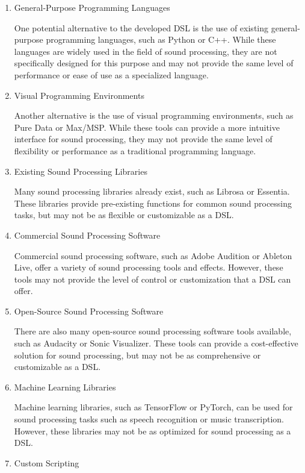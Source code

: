\begin{enumerate}
\item General-Purpose Programming Languages

One potential alternative to the developed DSL is the use of existing general-purpose programming languages, such as Python or C++. While these languages are widely used in the field of sound processing, they are not specifically designed for this purpose and may not provide the same level of performance or ease of use as a specialized language.

\item Visual Programming Environments

Another alternative is the use of visual programming environments, such as Pure Data or Max/MSP. While these tools can provide a more intuitive interface for sound processing, they may not provide the same level of flexibility or performance as a traditional programming language.

\item Existing Sound Processing Libraries

Many sound processing libraries already exist, such as Librosa or Essentia. These libraries provide pre-existing functions for common sound processing tasks, but may not be as flexible or customizable as a DSL.

\item Commercial Sound Processing Software

Commercial sound processing software, such as Adobe Audition or Ableton Live, offer a variety of sound processing tools and effects. However, these tools may not provide the level of control or customization that a DSL can offer.

\item Open-Source Sound Processing Software

There are also many open-source sound processing software tools available, such as Audacity or Sonic Visualizer. These tools can provide a cost-effective solution for sound processing, but may not be as comprehensive or customizable as a DSL.

\item Machine Learning Libraries

Machine learning libraries, such as TensorFlow or PyTorch, can be used for sound processing tasks such as speech recognition or music transcription. However, these libraries may not be as optimized for sound processing as a DSL.

\item Custom Scripting


\end{enumerate}
